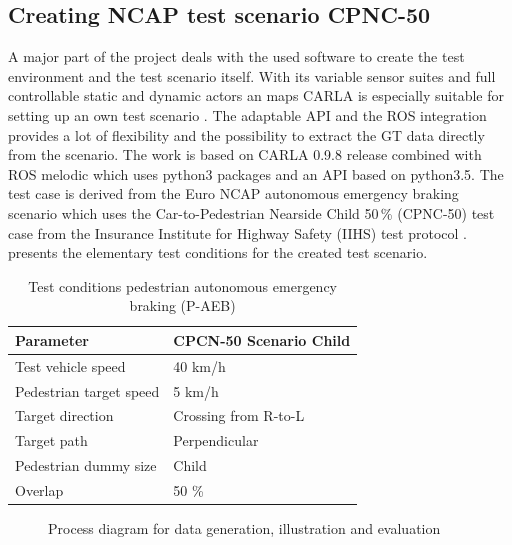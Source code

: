 \subsection{Creating NCAP test scenario CPNC-50}
A major part of the project deals with the used software to create the test environment and the test scenario itself. With its variable sensor suites and full controllable static and dynamic actors an maps CARLA is especially suitable for setting up an own test scenario \cite{Dosovitskiy17}. The adaptable \ac{API} and the \ac{ROS} integration provides a lot of flexibility and the possibility to extract the \ac{GT} data directly from the scenario. The work is based on CARLA 0.9.8 release combined with \ac{ROS} melodic which uses python3 packages and an \ac{API} based on python3.5. The test case is derived from the Euro NCAP autonomous emergency braking scenario which uses the Car-to-Pedestrian Nearside Child 50\,\% (CPNC-50) test case from the Insurance Institute for Highway Safety (IIHS) test protocol \cite{NCAP, Protocoll}.  presents the elementary test conditions for the created test scenario. 

\begin{table}[h]
	\caption{Test conditions pedestrian autonomous emergency braking (P-AEB) \cite{Protocoll}}
	\label{Test conditions}
	\begin{center}
		\begin{tabular}{l l}
			\hline
			Parameter & CPCN-50 Scenario Child\\
			\hline
			Test vehicle speed & 40 km/h\\
			Pedestrian target speed & 5 km/h\\
			Target direction        & Crossing from R-to-L\\
			Target path             & Perpendicular\\
			Pedestrian dummy size   & Child\\
			Overlap                 & 50 \%\\
			\hline	
		\end{tabular}
	\end{center}
\end{table}

\begin{figure}[]
	\centering
	\caption{Process diagram for data generation, illustration and evaluation}
	\label{fig:Overview}
\end{figure}

